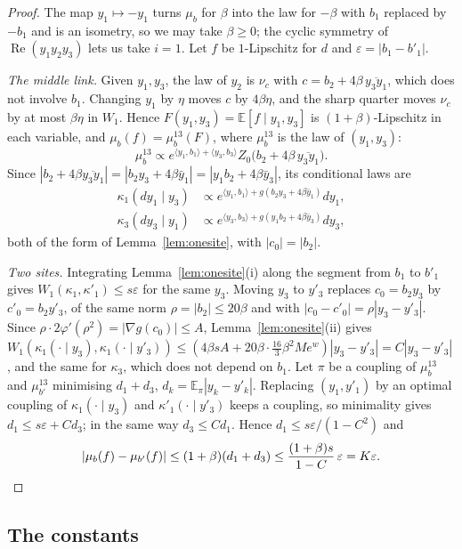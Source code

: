 \documentclass[aps,prd,twocolumn,superscriptaddress,nofootinbib,longbibliography,floatfix,amsmath,amssymb,10pt]{revtex4-2}
\theoremstyle{definition}
\theoremstyle{remark}
\newcommand{\E}{\mathbb{E}}
\newcommand{\ip}[2]{\langle #1,#2\rangle}
\begin{document}
\begin{proof}
The map $y_1\mapsto-y_1$ turns $\mu_b$ for $\beta$ into the law for $-\beta$
with $b_1$ replaced by $-b_1$ and is an isometry, so we may take $\beta\ge0$;
the cyclic symmetry of $\operatorname{Re}(y_1y_2y_3)$ lets us take $i=1$. Let
$f$ be $1$-Lipschitz for $d$ and $\varepsilon=|b_1-b'_1|$.

\emph{The middle link.} Given $y_1,y_3$, the law of $y_2$ is $\nu_c$ with $c=
b_2+4\beta\,\overline{y_3y_1}$, which does not involve $b_1$. Changing $y_1$
by $\eta$ moves $c$ by $4\beta\eta$, and the sharp quarter moves $\nu_c$ by at
most $\beta\eta$ in $W_1$. Hence $F(y_1,y_3)=\E[f\mid y_1,y_3]$ is
$(1+\beta)$-Lipschitz in each variable, and $\mu_b(f)=\mu^{13}_b(F)$, where
$\mu^{13}_b$ is the law of $(y_1,y_3)$:
\[
\mu^{13}_b\propto e^{\ip{y_1}{b_1}+\ip{y_3}{b_3}}Z_0\bigl(b_2+4\beta\,
\overline{y_3y_1}\bigr).
\]
Since $|b_2+4\beta\overline{y_3y_1}|=|b_2y_3+4\beta\bar y_1|=|y_1b_2+
4\beta\bar y_3|$, its conditional laws are
\[
\begin{split}
\kappa_1(dy_1\mid y_3)&\propto e^{\ip{y_1}{b_1}+g(b_2y_3+4\beta\bar y_1)}dy_1,\\
\kappa_3(dy_3\mid y_1)&\propto e^{\ip{y_3}{b_3}+g(y_1b_2+4\beta\bar y_3)}dy_3,
\end{split}
\]
both of the form of Lemma~\ref{lem:onesite}, with $|c_0|=|b_2|$.

\emph{Two sites.} Integrating Lemma~\ref{lem:onesite}(i) along the segment
from $b_1$ to $b'_1$ gives $W_1(\kappa_1,\kappa'_1)\le s\varepsilon$ for the
same $y_3$. Moving $y_3$ to $y'_3$ replaces $c_0=b_2y_3$ by $c'_0=b_2y'_3$,
of the same norm $\rho=|b_2|\le20\beta$ and with $|c_0-c'_0|=\rho|y_3-y'_3|$.
Since $\rho\cdot2\varphi'(\rho^2)=|\nabla g(c_0)|\le A$,
Lemma~\ref{lem:onesite}(ii) gives $W_1(\kappa_1(\cdot\mid y_3),\kappa_1(
\cdot\mid y'_3))\le(4\beta sA+20\beta\cdot\frac{16}3\beta^2Me^w)|y_3-y'_3|=
C|y_3-y'_3|$, and the same for $\kappa_3$, which does not depend on $b_1$. Let $\pi$ be a coupling of $\mu^{13}_b$ and $\mu^{13}_{b'}$
minimising $d_1+d_3$, $d_k=\E_\pi|y_k-y'_k|$. Replacing $(y_1,y'_1)$ by an
optimal coupling of $\kappa_1(\cdot\mid y_3)$ and $\kappa'_1(\cdot\mid y'_3)$
keeps a coupling, so minimality gives $d_1\le s\varepsilon+Cd_3$; in the
same way $d_3\le Cd_1$. Hence $d_1\le s\varepsilon/(1-C^2)$ and
\[
|\mu_b(f)-\mu_{b'}(f)|\le(1+\beta)(d_1+d_3)\le\frac{(1+\beta)s}{1-C}
\,\varepsilon=K\varepsilon .\qedhere
\]
\end{proof}

\subsection{The constants}
\end{document}
